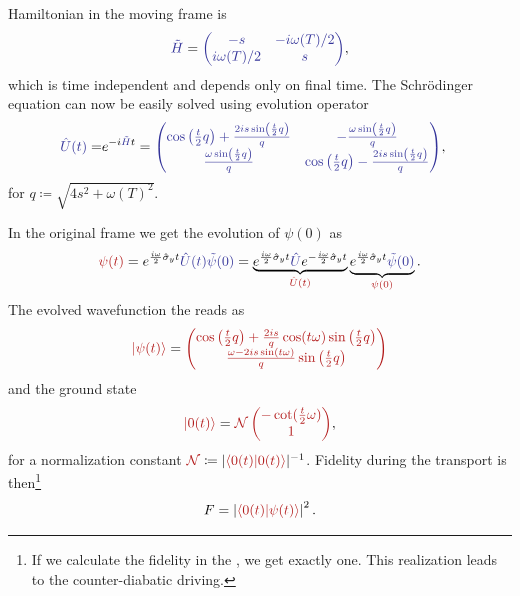 Hamiltonian in the moving frame is
\begin{equation}
    \bluee{\tilde H}=\bluee{\begin{pmatrix}
        -s&-i\omega(T)/2\\
        i\omega(T)/2&s
    \end{pmatrix}},
\end{equation}
which is time independent and depends only on final time. The Schr\"odinger equation can now be easily solved using evolution operator
\begin{equation}
    \begin{split}
        \bluee{\UU(t)}=&e^{-i\bluee{\tilde H}t}
        =\bluee{\begin{pmatrix}
            \cos \left(\frac{t}{2} q\right)+\frac{2 i s \sin \left(\frac{t}{2} q\right)}{q} & -\frac{\omega  \sin \left(\frac{t}{2} q\right)}{q} \\
            \frac{\omega  \sin \left(\frac{t}{2} q\right)}{q} & \cos \left(\frac{t}{2} q\right)-\frac{2 i s \sin \left(\frac{t}{2} q\right)}{q} \\
        \end{pmatrix}},
    \end{split}
    \label{eq:evolutionBlue}
\end{equation}
for $q\coloneqq\sqrt{4 s^2+\omega(T) ^2}$.

In the original frame we get the evolution of $\psi(0)$ as
\begin{equation}
    \redd{\psi(t)}=\expsp \bluee{\UU(t) \tilde\psi(0)} = \underbrace{\expsp \bluee{\UU}\expsm}_{\redd{\UU(t)}} \underbrace{\expsp \bluee{\tilde\psi(0)}}_{\redd{\psi(0)}}.
\end{equation}
The evolved wavefunction the reads as
\begin{equation}
    \redd{\ket{\psi(t)}}=\redd{\begin{pmatrix}
        \cos \left(\frac{t}{2} q\right)+\frac{2 i s}{q} \cos (t \omega ) \sin \left(\frac{t}{2} q\right)\\
        \frac{\omega -2 i s\sin (t \omega )}{q}  \sin \left(\frac{t}{2} q\right)
    \end{pmatrix}}
\end{equation}
and the ground state
\begin{equation}
    \redd{\ket{0(t)}}=\redd{\mathcal{N}\begin{pmatrix}
        -\cot (\frac{t}{2}\omega)\\
        1
    \end{pmatrix}},
\end{equation}
for a normalization constant $\redd{\mathcal{N}}\coloneqq |\redd{\braket{0(t)|0(t)}}|^{-1}$.
Fidelity during the transport is then\footnote{If we calculate the fidelity in the , we get exactly one. This realization leads to the counter-diabatic driving.}
\begin{equation}
    F=\left|\redd{\braket{0(t)|\psi(t)}}\right|^2.
    \label{fid:definition}
\end{equation}

